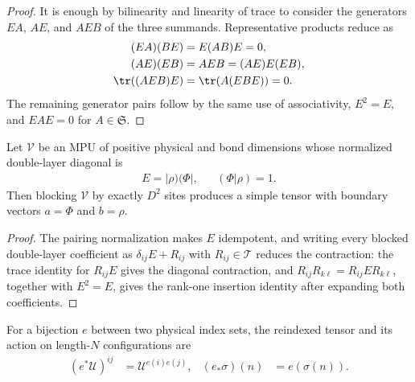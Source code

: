 \begin{proof}\leanok
    It is enough by bilinearity and linearity of trace to consider the
    generators $EA$, $AE$, and $AEB$ of the three summands.  Representative
    products reduce as
    \begin{align}
        (EA)(BE)    & =E(AB)E=0,      \\
        (AE)(EB)    & =AEB=(AE)E(EB), \\
        \tr((AEB)E) & =\tr(A(EBE))=0.
    \end{align}
    The remaining generator pairs follow by the same use of associativity,
    $E^2=E$, and $EAE=0$ for $A\in\mathfrak S$.
\end{proof}

\begin{lemma}
    \label{thm:mpu_second_block_simple}
    \leanok
    Let $\mathcal V$ be an MPU of positive physical and bond dimensions whose
    normalized double-layer diagonal is
    \begin{align}
        E=|\rho)(\Phi|,
         &  & (\Phi|\rho)=1.
    \end{align}
    Then blocking $\mathcal V$ by exactly $D^2$ sites produces a simple tensor
    with boundary vectors $a=\Phi$ and $b=\rho$.
\end{lemma}

\begin{proof}\leanok
    The pairing normalization makes $E$ idempotent, and writing every blocked
    double-layer coefficient as $\delta_{ij}E+R_{ij}$ with
    $R_{ij}\in\mathcal T$ reduces the contraction: the trace identity for $R_{ij}E$ gives the
    diagonal contraction, and
    $R_{ij}R_{k\ell}=R_{ij}ER_{k\ell}$, together with $E^2=E$, gives the
    rank-one insertion identity after expanding both coefficients.
\end{proof}

\begin{definition}
    \label{def:mpu_physical_reindexing}
    \leanok
    For a bijection $e$ between two physical index sets, the reindexed tensor
    and its action on length-$N$ configurations are
    \begin{align}
        (e^*\mathcal U)^{ij} & =\mathcal U^{e(i)e(j)},
                             & (e_*\sigma)(n)          & =e(\sigma(n)).
    \end{align}
\end{definition}

